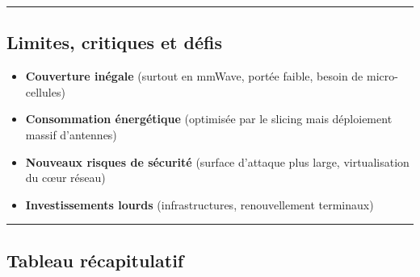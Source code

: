 \documentclass[
]{article}
\providecommand{\tightlist}{%
  \setlength{\itemsep}{0pt}\setlength{\parskip}{0pt}}
\begin{document}
\begin{center}\rule{0.5\linewidth}{0.5pt}\end{center}

\subsection{Limites, critiques et
défis}\label{limites-critiques-et-duxe9fis}

\begin{itemize}
\tightlist
\item
  \textbf{Couverture inégale} (surtout en mmWave, portée faible, besoin
  de micro-cellules)
\item
  \textbf{Consommation énergétique} (optimisée par le slicing mais
  déploiement massif d'antennes)
\item
  \textbf{Nouveaux risques de sécurité} (surface d'attaque plus large,
  virtualisation du cœur réseau)
\item
  \textbf{Investissements lourds} (infrastructures, renouvellement
  terminaux)
\end{itemize}

\begin{center}\rule{0.5\linewidth}{0.5pt}\end{center}

\subsection{Tableau récapitulatif}\label{tableau-ruxe9capitulatif}
\end{document}
